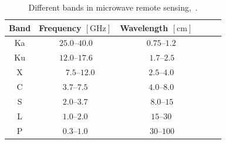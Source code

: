 \setlength{\tabcolsep}{6.0pt}
\begin{table}[!htb]
\caption[Different bands in microwave remote sensing]{\label{tab:bands}Different bands in microwave remote sensing,~\citep{Moreira2013}.}
\centering
\begin{tabular}[t]{cccccc}
\toprule
 \textbf{Band} & \multicolumn{1}{c}{\textbf{Frequency} $\left[\text{GHz}\right]$} & \multicolumn{1}{c}{\textbf{Wavelength} $\left[\text{cm}\right]$} \\
\midrule
Ka & $\,25.0$--$40.0$ & $\phantom{-}0.75$--$1.2$ \\
Ku & $\,12.0$--$17.6$ & $\phantom{-}\,1.7$--$2.5$ \\
X  & $\phantom{-}7.5$--$12.0$  & $\phantom{-}2.5$--$4.0$   \\
C  & $ 3.7$--$7.5$ & $\phantom{-}4.0$--$8.0$   \\
S  & $2.0$--$3.7$   & $\phantom{-}\,8.0$--$15$    \\
L  & $1.0$--$2.0$   & $\phantom{-}15$--$30$   \\
P  & $0.3$--$1.0$ & $\phantom{-}\,30$--$100$  \\
\bottomrule
\end{tabular}
\end{table}

	
